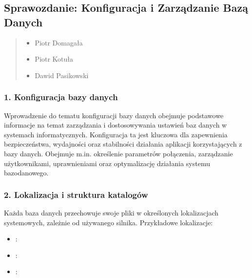 \documentclass[letterpaper,10pt,polish]{sphinxmanual}
\begin{document}
\subsection{Sprawozdanie: Konfiguracja i Zarządzanie Bazą Danych}
\label{\detokenize{rozdzial2/Konfiguracja_baz_danych/Konfiguracja_baz_danych:sprawozdanie-konfiguracja-i-zarzadzanie-baza-danych}}\label{\detokenize{rozdzial2/Konfiguracja_baz_danych/Konfiguracja_baz_danych::doc}}\begin{quote}\begin{description}
\begin{itemize}
\item {} 
\sphinxAtStartPar
Piotr Domagała

\item {} 
\sphinxAtStartPar
Piotr Kotuła

\item {} 
\sphinxAtStartPar
Dawid Pasikowski

\end{itemize}

\end{description}\end{quote}


\subsubsection{1. Konfiguracja bazy danych}
\label{\detokenize{rozdzial2/Konfiguracja_baz_danych/Konfiguracja_baz_danych:konfiguracja-bazy-danych}}
\sphinxAtStartPar
Wprowadzenie do tematu konfiguracji bazy danych obejmuje podstawowe informacje na temat zarządzania i dostosowywania ustawień baz danych w systemach informatycznych. Konfiguracja ta jest kluczowa dla zapewnienia bezpieczeństwa, wydajności oraz stabilności działania aplikacji korzystających z bazy danych. Obejmuje m.in. określenie parametrów połączenia, zarządzanie użytkownikami, uprawnieniami oraz optymalizację działania systemu bazodanowego.


\subsubsection{2. Lokalizacja i struktura katalogów}
\label{\detokenize{rozdzial2/Konfiguracja_baz_danych/Konfiguracja_baz_danych:lokalizacja-i-struktura-katalogow}}
\sphinxAtStartPar
Każda baza danych przechowuje swoje pliki w określonych lokalizacjach systemowych, zależnie od używanego silnika. Przykładowe lokalizacje:
\begin{itemize}
\item {} 
\sphinxAtStartPar
{}: 

\item {} 
\sphinxAtStartPar
{}: 

\item {} 
\sphinxAtStartPar
{}: 

\end{itemize}
\end{document}
